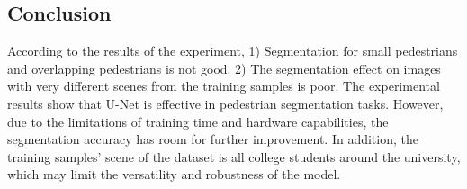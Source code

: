 \documentclass[10pt, a4paper]{article}
\begin{document}
\begin{multicols}{2}
	\section{Conclusion} \justify
	According to the results of the experiment, 1) Segmentation for small pedestrians and overlapping pedestrians is not good. 2) The segmentation effect on images with very different scenes from the training samples is poor. The experimental results show that U-Net is effective in pedestrian segmentation tasks. However, due to the limitations of training time and hardware capabilities, the segmentation accuracy has room for further improvement. In addition, the training samples' scene of the dataset is all college students around the university, which may limit the versatility and robustness of the model.

	
	  
	

	\end{multicols}
\end{document}
